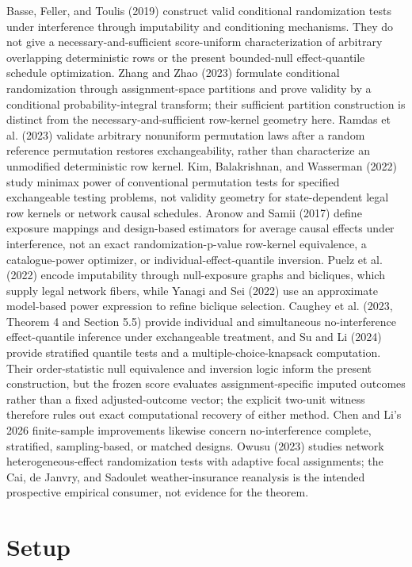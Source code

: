 \documentclass{article}
\begin{document}
Basse, Feller, and Toulis (2019) construct valid conditional randomization tests under interference through imputability and conditioning mechanisms. They do not give a necessary-and-sufficient score-uniform characterization of arbitrary overlapping deterministic rows or the present bounded-null effect-quantile schedule optimization. Zhang and Zhao (2023) formulate conditional randomization through assignment-space partitions and prove validity by a conditional probability-integral transform; their sufficient partition construction is distinct from the necessary-and-sufficient row-kernel geometry here. Ramdas et al. (2023) validate arbitrary nonuniform permutation laws after a random reference permutation restores exchangeability, rather than characterize an unmodified deterministic row kernel. Kim, Balakrishnan, and Wasserman (2022) study minimax power of conventional permutation tests for specified exchangeable testing problems, not validity geometry for state-dependent legal row kernels or network causal schedules. Aronow and Samii (2017) define exposure mappings and design-based estimators for average causal effects under interference, not an exact randomization-p-value row-kernel equivalence, a catalogue-power optimizer, or individual-effect-quantile inversion. Puelz et al. (2022) encode imputability through null-exposure graphs and bicliques, which supply legal network fibers, while Yanagi and Sei (2022) use an approximate model-based power expression to refine biclique selection. Caughey et al. (2023, Theorem 4 and Section 5.5) provide individual and simultaneous no-interference effect-quantile inference under exchangeable treatment, and Su and Li (2024) provide stratified quantile tests and a multiple-choice-knapsack computation. Their order-statistic null equivalence and inversion logic inform the present construction, but the frozen score evaluates assignment-specific imputed outcomes rather than a fixed adjusted-outcome vector; the explicit two-unit witness therefore rules out exact computational recovery of either method. Chen and Li's 2026 finite-sample improvements likewise concern no-interference complete, stratified, sampling-based, or matched designs. Owusu (2023) studies network heterogeneous-effect randomization tests with adaptive focal assignments; the Cai, de Janvry, and Sadoulet weather-insurance reanalysis is the intended prospective empirical consumer, not evidence for the theorem.

\section{Setup}
\end{document}
